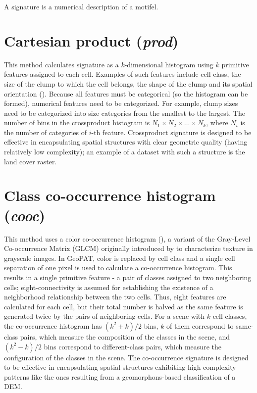 A signature is a numerical description of a motifel.

\section{Cartesian product ({\it prod})}

This method calculates signature as a $k$-dimensional histogram using $k$ primitive features assigned to each cell. 
Examples of such features include cell class, the size of the clump to which the cell belongs, the shape of the clump and its spatial orientation (\cite{Williams2008}). 
Because all features must be categorical (so the histogram can be formed), numerical features need to be categorized. 
For example, clump sizes need to be categorized into size categories from the smallest to the largest.
The number of bins in the crossproduct histogram is $N_1 \times N_2 \times \ldots \times N_k$, where $N_i$ is the number of categories of $i$-th feature. 
Crossproduct signature is designed to be effective in encapsulating spatial structures with clear geometric quality (having relatively low complexity); an example of a dataset with such a structure is the land cover raster.

\section{Class co-occurrence histogram ({\it cooc})}

This method uses a color co-occurrence histogram (\cite{Barnsley1996,Chang1999}), a variant of the Gray-Level Co-occurrence Matrix (GLCM) originally introduced by \cite{Haralick1973} to characterize texture in grayscale images.
In GeoPAT, color is replaced by cell class and a single cell separation of one pixel is used to calculate a co-occurrence histogram. 
This results in a single primitive feature - a pair of classes assigned to two neighboring cells; eight-connectivity is assumed for establishing the existence of a neighborhood relationship between the two cells. 
Thus, eight features are calculated for each cell, but their total number is halved as the same feature is generated twice by the pairs of neighboring cells.
For a scene with $k$ cell classes, the co-occurrence histogram has $(k^2+k)/2$ bins, $k$ of them correspond to same-class pairs, which measure the composition of the classes in the scene, and $(k^2-k)/2$ bins correspond to different-class pairs, which measure the configuration of the classes in the scene. 
The co-occurrence signature is designed to be effective in encapsulating spatial structures exhibiting high complexity patterns like the ones resulting from a geomorphons-based classification of a DEM. 

